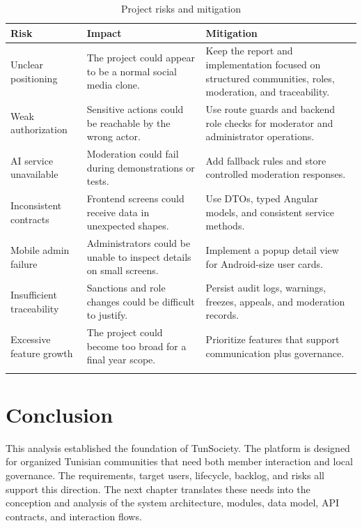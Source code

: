 \begin{longtable}{|m{3.3cm}|m{4.9cm}|m{5.8cm}|}
\hline
\textbf{Risk} & \textbf{Impact} & \textbf{Mitigation} \\
\hline
Unclear positioning & The project could appear to be a normal social media clone. & Keep the report and implementation focused on structured communities, roles, moderation, and traceability. \\
\hline
Weak authorization & Sensitive actions could be reachable by the wrong actor. & Use route guards and backend role checks for moderator and administrator operations. \\
\hline
AI service unavailable & Moderation could fail during demonstrations or tests. & Add fallback rules and store controlled moderation responses. \\
\hline
Inconsistent contracts & Frontend screens could receive data in unexpected shapes. & Use DTOs, typed Angular models, and consistent service methods. \\
\hline
Mobile admin failure & Administrators could be unable to inspect details on small screens. & Implement a popup detail view for Android-size user cards. \\
\hline
Insufficient traceability & Sanctions and role changes could be difficult to justify. & Persist audit logs, warnings, freezes, appeals, and moderation records. \\
\hline
Excessive feature growth & The project could become too broad for a final year scope. & Prioritize features that support communication plus governance. \\
\hline
\caption{Project risks and mitigation}
\end{longtable}

\section{Conclusion}

This analysis established the foundation of TunSociety. The platform is designed for organized Tunisian communities that need both member interaction and local governance. The requirements, target users, lifecycle, backlog, and risks all support this direction. The next chapter translates these needs into the conception and analysis of the system architecture, modules, data model, API contracts, and interaction flows.
